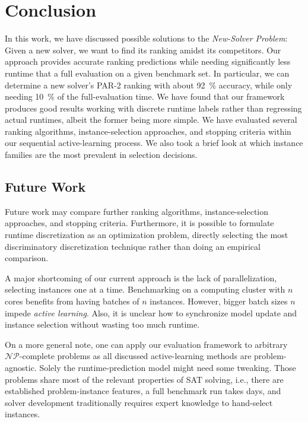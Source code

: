 \documentclass[runningheads]{llncs}
\begin{document}
\section{Conclusion}

In this work, we have discussed possible solutions to the \emph{New-Solver Problem}:
Given a new solver, we want to find its ranking amidst its competitors.
Our approach provides accurate ranking predictions while needing significantly less runtime that a full evaluation on a given benchmark set.
In particular, we can determine a new solver's PAR-2 ranking with about \SI{92}{\%} accuracy, while only needing \SI{10}{\%} of the full-evaluation time.
We have found that our framework produces good results working with discrete runtime labels rather than regressing actual runtimes, albeit the former being more simple.
We have evaluated several ranking algorithms, instance-selection approaches, and stopping criteria within our sequential active-learning process.
We also took a brief look at which instance families are the most prevalent in selection decisions.

\subsection{Future Work}

Future work may compare further ranking algorithms, instance-selection approaches, and stopping criteria.
Furthermore, it is possible to formulate runtime discretization as an optimization problem, directly selecting the most discriminatory discretization technique rather than doing an empirical comparison.

A major shortcoming of our current approach is the lack of parallelization, selecting instances one at a time.
Benchmarking on a computing cluster with $n$ cores benefits from having batches of $n$ instances.
However, bigger batch sizes $n$ impede \emph{active learning}.
Also, it is unclear how to synchronize model update and instance selection without wasting too much runtime.

On a more general note, one can apply our evaluation framework to arbitrary $\mathcal{NP}$-complete problems as all discussed active-learning methods are problem-agnostic.
Solely the runtime-prediction model might need some tweaking.
Those problems share most of the relevant properties of SAT solving, i.e., there are established problem-instance features, a full benchmark run takes days, and solver development traditionally requires expert knowledge to hand-select instances.


%
%


\end{document}
